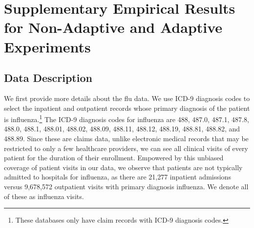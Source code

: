 \section{Supplementary Empirical Results for Non-Adaptive and Adaptive Experiments}\label{sec:supplementary-empirical}

\subsection{Data Description}\label{subsec:description-data-sets}

We first provide more details about the flu data. We use ICD-9 diagnosis codes to select the inpatient and outpatient records whose primary diagnosis of the patient is influenza.\footnote{These databases only have claim records with ICD-9 diagnosis codes.} The ICD-9 diagnosis codes for influenza are 488, 487.0, 487.1, 487.8, 488.0, 488.1, 488.01, 488.02, 488.09, 488.11, 488.12, 488.19, 488.81, 488.82, and 488.89.
Since these are claims data, unlike electronic medical records that may be restricted to only a few healthcare providers, we can see all clinical visits of every patient for the duration of their enrollment. Empowered by this unbiased coverage of patient visits in our data, we observe that patients are not typically admitted to hospitals for influenza, as there are 21,277 inpatient admissions versus 9,678,572 outpatient visits with primary diagnosis influenza. We denote all of these as influenza visits. 

